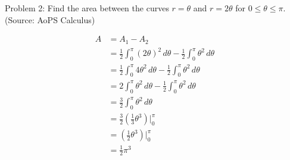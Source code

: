 Problem 2: Find the area between the curves $r = \theta$ and $r = 2\theta$ for $0 \leq \theta \leq \pi$. (Source: AoPS Calculus)

\begin{align*}
A &= A_1 - A_2 \\
&= \frac{1}{2} \int_0^\pi (2\theta)^2 \, d\theta - \frac{1}{2} \int_0^\pi \theta^2 \, d\theta \\
&= \frac{1}{2} \int_0^\pi 4 \theta^2 \, d\theta - \frac{1}{2} \int_0^\pi \theta^2 \, d\theta \\
&= 2 \int_0^\pi \theta^2 \, d\theta - \frac{1}{2} \int_0^\pi \theta^2 \, d\theta \\
&= \frac{3}{2} \int_0^\pi \theta^2 \, d\theta \\
&= \frac{3}{2} \left( \frac{1}{3} \theta^3 \right) \Bigg|_0^\pi \\
&= \left( \frac{1}{2} \theta^3 \right) \Bigg|_0^\pi \\
&= \boxed{\frac{1}{2} \pi^3}
\end{align*}
